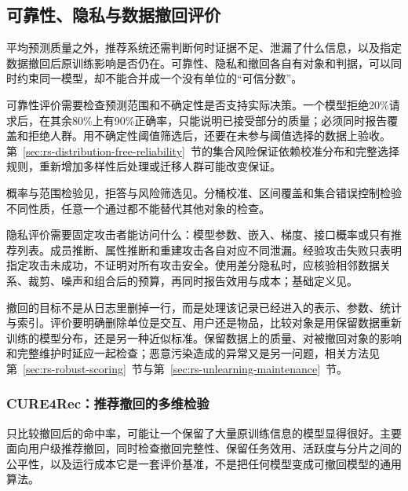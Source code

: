 \subsection{可靠性、隐私与数据撤回评价}
\label{sec:rs-evaluation-protection}

平均预测质量之外，推荐系统还需判断何时证据不足、泄漏了什么信息，以及指定数据撤回后原训练影响是否仍在。可靠性、隐私和撤回各自有对象和判据，可以同时约束同一模型，却不能合并成一个没有单位的“可信分数”。

可靠性评价需要检查预测范围和不确定性是否支持实际决策。一个模型拒绝20\%请求后，在其余80\%上有90\%正确率，只能说明已接受部分的质量；必须同时报告覆盖和拒绝人群。用不确定性阈值筛选后，还要在未参与阈值选择的数据上验收。第~\ref{sec:rs-distribution-free-reliability}~节的集合风险保证依赖校准分布和完整选择规则，重新增加多样性后处理或迁移人群可能改变保证。

概率与范围检验见，拒答与风险筛选见。分桶校准、区间覆盖和集合错误控制检验不同性质，任意一个通过都不能替代其他对象的检查。

隐私评价需要固定攻击者能访问什么：模型参数、嵌入、梯度、接口概率或只有推荐列表。成员推断、属性推断和重建攻击各自对应不同泄漏。经验攻击失败只表明指定攻击未成功，不证明对所有攻击安全。使用差分隐私时，应核验相邻数据关系、裁剪、噪声和组合后的预算，再同时报告效用与成本；基础定义见。

撤回的目标不是从日志里删掉一行，而是处理该记录已经进入的表示、参数、统计与索引。评价要明确删除单位是交互、用户还是物品，比较对象是用保留数据重新训练的模型分布，还是另一种近似标准。保留数据上的质量、对被撤回对象的影响和完整维护时延应一起检查；恶意污染造成的异常又是另一问题，相关方法见第~\ref{sec:rs-robust-scoring}~节与第~\ref{sec:rs-unlearning-maintenance}~节。

\Needspace{100mm}
\subsubsection{CURE4Rec：推荐撤回的多维检验}
\label{sec:rs-evaluation-cure4rec}

只比较撤回后的命中率，可能让一个保留了大量原训练信息的模型显得很好。主要面向用户级推荐撤回，同时检查撤回完整性、保留任务效用、活跃度与分片之间的公平性，以及运行成本它是一套评价基准，不是把任何模型变成可撤回模型的通用算法。

